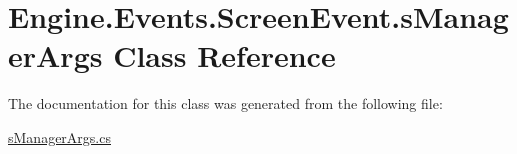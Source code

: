 \hypertarget{a00386}{}\section{Engine.\+Events.\+Screen\+Event.\+s\+Manager\+Args Class Reference}
\label{a00386}


The documentation for this class was generated from the following file\+:\begin{DoxyCompactItemize}
\item 
\hyperlink{a00071}{s\+Manager\+Args.\+cs}\end{DoxyCompactItemize}
